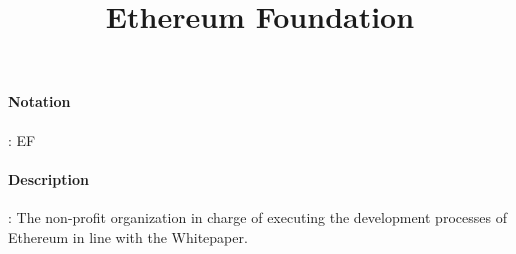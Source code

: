 \documentclass[10pt,a4paper,oneside]{scrartcl}
\author{}
\title{Ethereum Foundation}
\date{}
\begin{document}
\maketitle
\paragraph{Notation}: EF 
\paragraph{Description}: The non-profit organization in charge of executing the development processes of Ethereum in line with the Whitepaper. 
\end{document}
